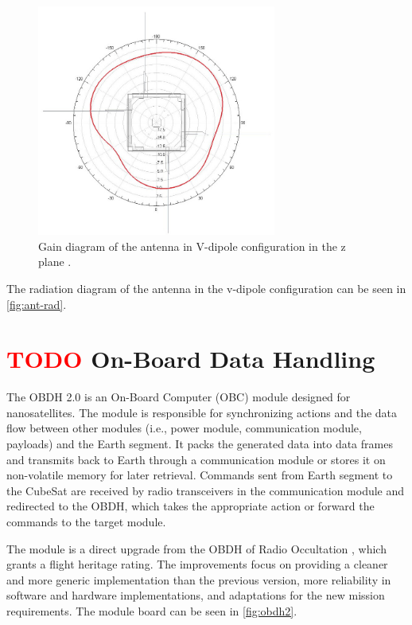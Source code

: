 \begin{figure}[!ht]
    \begin{center}
        \includegraphics[width=0.7\textwidth]{figures/subsystems/sat_2drad_dipv_z.jpg}
        \caption{ Gain diagram of the antenna in V-dipole configuration in the z plane \cite{ant-rad}.}
        \label{fig:ant-rad}
    \end{center}
\end{figure}

The radiation diagram of the antenna in the v-dipole configuration can be seen in \autoref{fig:ant-rad}.

\section{ \textcolor{red}{TODO} On-Board Data Handling}

The OBDH 2.0 is an On-Board Computer (OBC) module designed for nanosatellites. The module is responsible for synchronizing actions and the data flow between other modules (i.e., power module, communication module, payloads) and the Earth segment. It packs the generated data into data frames and transmits back to Earth through a communication module or stores it on non-volatile memory for later retrieval. Commands sent from Earth segment to the CubeSat are received by radio transceivers in the communication module and redirected to the OBDH, which takes the appropriate action or forward the commands to the target module.

The module is a direct upgrade from the OBDH of Radio Occultation \cite{floripasat}, which grants a flight heritage rating. The improvements focus on providing a cleaner and more generic implementation than the previous version, more reliability in software and hardware implementations, and adaptations for the new mission requirements. The module board can be seen in \autoref{fig:obdh2}.

